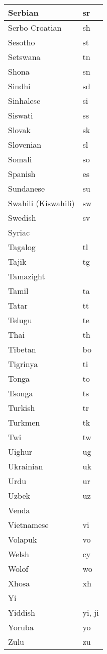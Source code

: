 \begin{longtable}{|l|l|}
\hline
Serbian				&sr\\
\hline
Serbo-Croatian		&	sh\\
\hline
Sesotho				&st\\
\hline
Setswana			&	tn\\
\hline
Shona				&sn\\
\hline
Sindhi				&sd\\
\hline
Sinhalese				&si\\
\hline
Siswati				&ss\\
\hline
Slovak				&sk\\
\hline
Slovenian				&sl \\
\hline
Somali				&so\\
\hline
Spanish				&es\\
\hline
Sundanese			&	su\\
\hline
Swahili (Kiswahili)		&	sw\\
\hline
Swedish				&sv\\
\hline
Syriac				& \\
\hline
Tagalog				&tl\\
\hline
Tajik					&tg\\
\hline
Tamazight			& \\
\hline
Tamil				&ta\\
\hline
Tatar				&tt\\
\hline
Telugu				&te\\
\hline
Thai					&th\\
\hline
Tibetan				&bo\\
\hline
Tigrinya				&ti\\
\hline
Tonga				&to\\
\hline
Tsonga				&ts\\
\hline
Turkish				&tr\\
\hline
Turkmen				&tk\\
\hline
Twi					&tw\\
\hline
Uighur				&		ug\\
\hline
Ukrainian				&uk\\
\hline
Urdu				&ur\\
\hline
Uzbek				&uz\\
\hline
Venda				& \\
\hline
Vietnamese			&vi\\
\hline
Volapuk				&vo\\
\hline
Welsh				&cy\\
\hline
Wolof				&wo\\
\hline
Xhosa				&xh\\
\hline
Yi	 				&\\
\hline
Yiddish				&yi, ji\\
\hline
Yoruba				&yo\\
\hline
Zulu					&zu\\
\hline
\end{longtable}
